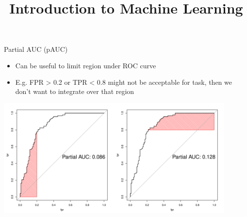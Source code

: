 




\newcommand{\titlefigure}{figure/eval_mclass_roc_sp_13}
\newcommand{\learninggoals}{
\item Understand partial AUC and its motivation 
\item Understand multi-class AUC variants
}


\title{Introduction to Machine Learning}
\date{}



\sloppy


\begin{vbframe}{Partial AUC (pAUC)}

\begin{itemize}
  \item Can be useful to limit region under ROC curve
  \item E.g. FPR > 0.2 or TPR < 0.8 might not be acceptable for task, then 
      we don't want to integrate over that region
\end{itemize}

\begin{knitrout}\scriptsize
{}\color{fgcolor}
{\centering \includegraphics[width=0.9\textwidth]{figure/eval_mclass_roc_sp_13}}
\end{knitrout}

\end{vbframe}

